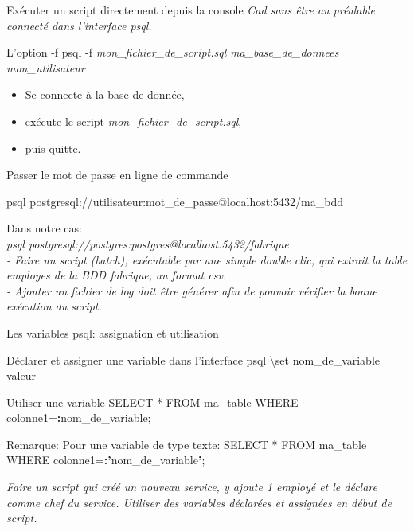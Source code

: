 \documentclass[dvipsnames]{beamer}
\begin{document}
\begin{frame}[t]{Exécuter un script directement depuis la console}
	\textit{{\footnotesize Cad sans être au préalable connecté dans l'interface psql.}}
	\begin{block}{L'option -f}
		psql -f \textit{mon\_fichier\_de\_script.sql} \textit{ma\_base\_de\_donnees} \textit{mon\_utilisateur}\\
		\begin{itemize}
			\item Se connecte à la base de donnée,
			\item exécute le script \textit{mon\_fichier\_de\_script.sql},
			\item puis quitte.
		\end{itemize}
	\end{block}
\end{frame}


\begin{frame}{Passer le mot de passe en ligne de commande}
	\begin{block}{}
		{\small psql postgresql://utilisateur:mot\_de\_passe@localhost:5432/ma\_bdd}
	\end{block}
	
	Dans notre cas:\\ \textit{psql postgresql://postgres:postgres@localhost:5432/fabrique}\\

	\vspace{1em}
	\textit{- Faire un script (batch), exécutable par une simple double clic, qui extrait la table employes de la BDD fabrique, au format csv.}\\
	\textit{- Ajouter un fichier de log doit être générer afin de pouvoir vérifier la bonne exécution du script.}
	

\end{frame}


\begin{frame}{Les variables psql: assignation et utilisation}
	\begin{block}{Déclarer et assigner une variable dans l'interface psql}
		\textbackslash set nom\_de\_variable valeur
	\end{block}

	\begin{block}{Utiliser une variable}
		SELECT * FROM ma\_table WHERE colonne1=\textbf{:}nom\_de\_variable;
	\end{block}
	Remarque: Pour une variable de type texte:
		SELECT * FROM ma\_table WHERE colonne1=\textbf{:'}nom\_de\_variable\textbf{'};
 
	\textit{Faire un script qui créé un nouveau service, y ajoute 1 employé et le déclare comme chef du service. Utiliser des variables déclarées et assignées en début de script.}
	
\end{frame}
\end{document}
